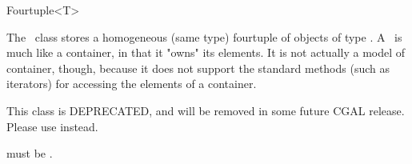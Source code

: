 \begin{ccRefClass}{Fourtuple<T>}
  
  \ccDefinition The \ccRefName\ class stores a homogeneous (same type)
  fourtuple of objects of type .  A \ccRefName\ is much like a
  container, in that it "owns" its elements. It is not actually a model of
  container, though, because it does not support the standard methods (such as
  iterators) for accessing the elements of a container.

  This class is DEPRECATED, and will be removed in some future CGAL release.
  Please use  instead.

  
  \ccRequirements {} must be .


  \ccTypes

  \ccGlue
  \ccGlue
  \ccGlue

  \ccCreation
  
  
  
\end{ccRefClass}



